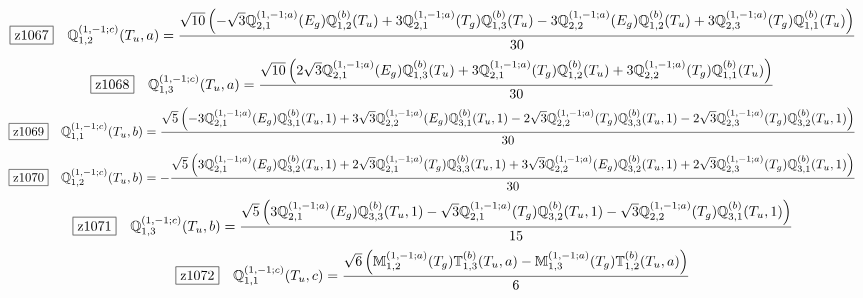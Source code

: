 \documentclass[fleqn,10pt,landscape]{jsarticle}
\begin{document}
\begin{dmath*}
\hspace*{3mm}\fbox{z1067}\quad \mathbb{Q}_{1,2}^{(1,-1;c)}(T_{u},a)=\frac{\sqrt{10} \left(- \sqrt{3} \mathbb{Q}_{2,1}^{(1,-1;a)}(E_{g}) \mathbb{Q}_{1,2}^{(b)}(T_{u}) + 3 \mathbb{Q}_{2,1}^{(1,-1;a)}(T_{g}) \mathbb{Q}_{1,3}^{(b)}(T_{u}) - 3 \mathbb{Q}_{2,2}^{(1,-1;a)}(E_{g}) \mathbb{Q}_{1,2}^{(b)}(T_{u}) + 3 \mathbb{Q}_{2,3}^{(1,-1;a)}(T_{g}) \mathbb{Q}_{1,1}^{(b)}(T_{u})\right)}{30}
\end{dmath*}
\begin{dmath*}
\hspace*{3mm}\fbox{z1068}\quad \mathbb{Q}_{1,3}^{(1,-1;c)}(T_{u},a)=\frac{\sqrt{10} \left(2 \sqrt{3} \mathbb{Q}_{2,1}^{(1,-1;a)}(E_{g}) \mathbb{Q}_{1,3}^{(b)}(T_{u}) + 3 \mathbb{Q}_{2,1}^{(1,-1;a)}(T_{g}) \mathbb{Q}_{1,2}^{(b)}(T_{u}) + 3 \mathbb{Q}_{2,2}^{(1,-1;a)}(T_{g}) \mathbb{Q}_{1,1}^{(b)}(T_{u})\right)}{30}
\end{dmath*}
\begin{dmath*}
\hspace*{3mm}\fbox{z1069}\quad \mathbb{Q}_{1,1}^{(1,-1;c)}(T_{u},b)=\frac{\sqrt{5} \left(- 3 \mathbb{Q}_{2,1}^{(1,-1;a)}(E_{g}) \mathbb{Q}_{3,1}^{(b)}(T_{u},1) + 3 \sqrt{3} \mathbb{Q}_{2,2}^{(1,-1;a)}(E_{g}) \mathbb{Q}_{3,1}^{(b)}(T_{u},1) - 2 \sqrt{3} \mathbb{Q}_{2,2}^{(1,-1;a)}(T_{g}) \mathbb{Q}_{3,3}^{(b)}(T_{u},1) - 2 \sqrt{3} \mathbb{Q}_{2,3}^{(1,-1;a)}(T_{g}) \mathbb{Q}_{3,2}^{(b)}(T_{u},1)\right)}{30}
\end{dmath*}
\begin{dmath*}
\hspace*{3mm}\fbox{z1070}\quad \mathbb{Q}_{1,2}^{(1,-1;c)}(T_{u},b)=- \frac{\sqrt{5} \left(3 \mathbb{Q}_{2,1}^{(1,-1;a)}(E_{g}) \mathbb{Q}_{3,2}^{(b)}(T_{u},1) + 2 \sqrt{3} \mathbb{Q}_{2,1}^{(1,-1;a)}(T_{g}) \mathbb{Q}_{3,3}^{(b)}(T_{u},1) + 3 \sqrt{3} \mathbb{Q}_{2,2}^{(1,-1;a)}(E_{g}) \mathbb{Q}_{3,2}^{(b)}(T_{u},1) + 2 \sqrt{3} \mathbb{Q}_{2,3}^{(1,-1;a)}(T_{g}) \mathbb{Q}_{3,1}^{(b)}(T_{u},1)\right)}{30}
\end{dmath*}
\begin{dmath*}
\hspace*{3mm}\fbox{z1071}\quad \mathbb{Q}_{1,3}^{(1,-1;c)}(T_{u},b)=\frac{\sqrt{5} \left(3 \mathbb{Q}_{2,1}^{(1,-1;a)}(E_{g}) \mathbb{Q}_{3,3}^{(b)}(T_{u},1) - \sqrt{3} \mathbb{Q}_{2,1}^{(1,-1;a)}(T_{g}) \mathbb{Q}_{3,2}^{(b)}(T_{u},1) - \sqrt{3} \mathbb{Q}_{2,2}^{(1,-1;a)}(T_{g}) \mathbb{Q}_{3,1}^{(b)}(T_{u},1)\right)}{15}
\end{dmath*}
\begin{dmath*}
\hspace*{3mm}\fbox{z1072}\quad \mathbb{Q}_{1,1}^{(1,-1;c)}(T_{u},c)=\frac{\sqrt{6} \left(\mathbb{M}_{1,2}^{(1,-1;a)}(T_{g}) \mathbb{T}_{1,3}^{(b)}(T_{u},a) - \mathbb{M}_{1,3}^{(1,-1;a)}(T_{g}) \mathbb{T}_{1,2}^{(b)}(T_{u},a)\right)}{6}
\end{dmath*}
\end{document}
